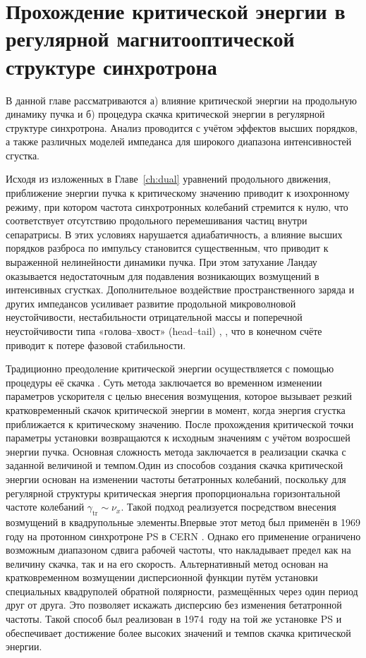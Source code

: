
	\chapter{Прохождение критической энергии в регулярной магнитооптической структуре синхротрона}\label{ch:transition}

\par В данной главе рассматриваются а) влияние критической энергии на продольную динамику пучка и б) процедура скачка критической энергии в регулярной структуре синхротрона. Анализ проводится с учётом эффектов высших порядков, а также различных моделей импеданса для широкого диапазона интенсивностей сгустка.

\par Исходя из изложенных в Главе~\ref{ch:dual} уравнений продольного движения, приближение энергии пучка к критическому значению приводит к изохронному режиму, при котором частота синхротронных колебаний стремится к нулю, что соответствует отсутствию продольного перемешивания частиц внутри сепаратрисы. В этих условиях нарушается адиабатичность, а влияние высших порядков разброса по импульсу становится существенным, что приводит к выраженной нелинейности динамики пучка. При этом затухание Ландау оказывается недостаточным для подавления возникающих возмущений в интенсивных сгустках. Дополнительное воздействие пространственного заряда и других импедансов усиливает развитие продольной микроволновой неустойчивости, нестабильности отрицательной массы и поперечной неустойчивости типа «голова–хвост» (head–tail) \cite{ng}, \cite{MetralMohl}, что в конечном счёте приводит к потере фазовой стабильности.

\par	Традиционно преодоление критической энергии осуществляется с помощью процедуры её скачка \cite{risselada:jump}. Суть метода заключается во временном изменении параметров ускорителя с целью внесения возмущения, которое вызывает резкий кратковременный скачок критической энергии в момент, когда энергия сгустка приближается к критическому значению. После прохождения критической точки параметры установки возвращаются к исходным значениям с учётом возросшей энергии пучка. Основная сложность метода заключается в реализации скачка с заданной величиной и темпом.Один из способов создания скачка критической энергии основан на изменении частоты бетатронных колебаний, поскольку для регулярной структуры критическая энергия пропорциональна горизонтальной частоте колебаний $\gamma_{\text{tr}}\sim\nu_{x}$. Такой подход реализуется посредством внесения возмущений в квадрупольные элементы.Впервые этот метод был применён в 1969 году на протонном синхротроне PS в CERN \cite{cern:q-jump}. Однако его применение ограничено возможным диапазоном сдвига рабочей частоты, что накладывает предел как на величину скачка, так и на его скорость. Альтернативный метод основан на кратковременном возмущении дисперсионной функции путём установки специальных квадруполей обратной полярности, размещённых через один период друг от друга. Это позволяет искажать дисперсию без изменения бетатронной частоты. Такой способ был реализован в 1974~году на той же установке PS \cite{cern:new-jump} и обеспечивает достижение более высоких значений и темпов скачка критической энергии.

